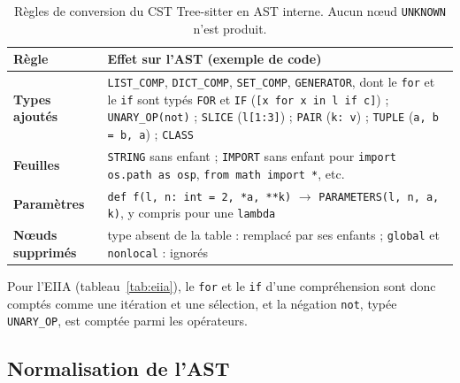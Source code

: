 \documentclass[12pt,a4paper,oneside]{report}
\begin{document}
\begin{table}[htbp]
\centering
\small
\renewcommand{\arraystretch}{1.2}
\begin{tabularx}{\textwidth}{>{\bfseries}p{3.0cm}X}
\toprule
Règle & Effet sur l'AST (exemple de code) \\
\midrule
Types ajoutés &
  \texttt{LIST\_COMP}, \texttt{DICT\_COMP}, \texttt{SET\_COMP},
  \texttt{GENERATOR}, dont le \texttt{for} et le \texttt{if} sont typés
  \texttt{FOR} et \texttt{IF} (\texttt{[x for x in l if c]}) ; \texttt{UNARY\_OP(not)} ;
  \texttt{SLICE} (\texttt{l[1:3]}) ; \texttt{PAIR} (\texttt{k: v}) ;
  \texttt{TUPLE} (\texttt{a, b = b, a}) ; \texttt{CLASS} \\
Feuilles &
  \texttt{STRING} sans enfant ;
  \texttt{IMPORT} sans enfant pour \texttt{import os.path as osp},
  \texttt{from math import *}, etc. \\
Paramètres &
  \texttt{def f(l, n: int = 2, *a, **k)} $\rightarrow$
  \texttt{PARAMETERS(l, n, a, k)}, y compris pour une \texttt{lambda} \\
Nœuds supprimés &
  type absent de la table : remplacé par ses enfants ;
  \texttt{global} et \texttt{nonlocal} : ignorés \\
\bottomrule
\end{tabularx}
\caption{Règles de conversion du CST Tree-sitter en AST interne. Aucun nœud
\texttt{UNKNOWN} n'est produit.}
\label{tab:kind_map}
\end{table}

Pour l'EIIA (tableau~\ref{tab:eiia}), le \texttt{for} et le \texttt{if}
d'une compréhension sont donc comptés comme une itération et une sélection,
et la négation \texttt{not}, typée \texttt{UNARY\_OP}, est comptée parmi les
opérateurs.

\subsection{Normalisation de l'AST}
\end{document}
